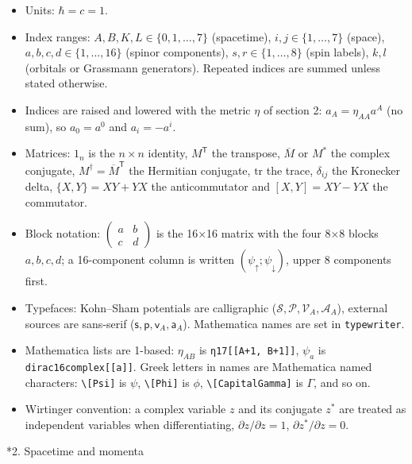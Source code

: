 \documentclass[10pt,a4paper]{article}
\makeatletter
\renewcommand\section{\@startsection{section}{1}{\z@}{-3.5ex \@plus -1ex \@minus -.2ex}{2.3ex \@plus.2ex}{\normalfont\Large\bfseries\raggedright}}
\makeatother
\begin{document}
\begin{itemize}
\item Units: $\hbar=c=1$.
\item Index ranges: $A,B,K,L\in\lbrace0,1,\dots,7\rbrace$ (spacetime), $i,j\in\lbrace1,\dots,7\rbrace$ (space), $a,b,c,d\in\lbrace1,\dots,16\rbrace$ (spinor components), $s,r\in\lbrace1,\dots,8\rbrace$ (spin labels), $k,l$ (orbitals or Grassmann generators). Repeated indices are summed unless stated otherwise.
\item Indices are raised and lowered with the metric $\eta$ of section 2: $a_A=\eta_{AA}a^A$ (no sum), so $a_0=a^0$ and $a_i=-a^i$.
\item Matrices: $1_n$ is the $n\times n$ identity, $M^{\mathsf T}$ the transpose, $\overline M$ or $M^*$ the complex conjugate, $M^\dagger=\overline M^{\mathsf T}$ the Hermitian conjugate, $\mathrm{tr}$ the trace, $\delta_{ij}$ the Kronecker delta, $\lbrace X,Y\rbrace=XY+YX$ the anticommutator and $[X,Y]=XY-YX$ the commutator.
\item Block notation: $\left(\begin{smallmatrix}a&b\\c&d\end{smallmatrix}\right)$ is the 16×16 matrix with the four 8×8 blocks $a,b,c,d$; a 16-component column is written $(\psi_\uparrow;\psi_\downarrow)$, upper 8 components first.
\item Typefaces: Kohn–Sham potentials are calligraphic ($\mathcal S,\mathcal P,\mathcal V_A,\mathcal A_A$), external sources are sans-serif ($\mathsf s,\mathsf p,\mathsf v_A,\mathsf a_A$). Mathematica names are set in \texttt{typewriter}.
\item Mathematica lists are 1-based: $\eta_{AB}$ is \texttt{η17[[A+1, B+1]]}, $\psi_a$ is \texttt{dirac16complex[[a]]}. Greek letters in names are Mathematica named characters: \texttt{\textbackslash{}\allowbreak{}[Psi]} is \texorpdfstring{\ensuremath{\psi}}{ψ}, \texttt{\textbackslash{}\allowbreak{}[Phi]} is \texorpdfstring{\ensuremath{\phi}}{ϕ}, \texttt{\textbackslash{}\allowbreak{}[CapitalGamma]} is \texorpdfstring{\ensuremath{\Gamma}}{Γ}, and so on.
\item Wirtinger convention: a complex variable $z$ and its conjugate $z^*$ are treated as independent variables when differentiating, $\partial z/\partial z=1$, $\partial z^*/\partial z=0$.
\end{itemize}
\section*{2. Spacetime and momenta}
\end{document}
